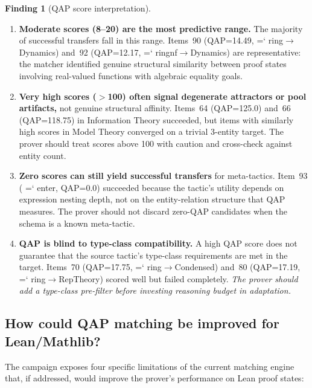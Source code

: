 \documentclass[11pt]{article}
\renewcommand{\texttt}[1]{%
  \begingroup\ttfamily\hyphenchar\font=`\-\relax
  \def\_{\textunderscore\discretionary{}{}{}}%
  #1\endgroup}
\theoremstyle{definition}
\newtheorem{finding}[theorem]{Finding}
\theoremstyle{remark}
\begin{document}
\begin{finding}[QAP score interpretation]%
\label{find:qap}
\begin{enumerate}
\item \textbf{Moderate scores (8--20) are the most predictive
  range.}  The majority of successful transfers fall in this range.
  Items~90 (QAP=14.49, \texttt{ring}$\to$Dynamics) and~92
  (QAP=12.17, \texttt{ring\_nf}$\to$Dynamics) are representative:
  the matcher identified genuine structural similarity between proof
  states involving real-valued functions with algebraic equality
  goals.

\item \textbf{Very high scores ($>$100) often signal degenerate
  attractors or pool artifacts,} not genuine structural affinity.
  Items~64 (QAP=125.0) and~66 (QAP=118.75) in Information Theory
  succeeded, but items with similarly high scores in Model Theory
  converged on a trivial 3-entity target.  The prover should treat
  scores above 100 with caution and cross-check against entity
  count.

\item \textbf{Zero scores can still yield successful transfers}
  for meta-tactics.  Item~93 (\texttt{enter}, QAP=0.0) succeeded
  because the tactic's utility depends on expression nesting depth,
  not on the entity-relation structure that QAP measures.  The
  prover should not discard zero-QAP candidates when the schema
  is a known meta-tactic.

\item \textbf{QAP is blind to type-class compatibility.}  A high
  QAP score does not guarantee that the source tactic's type-class
  requirements are met in the target.  Items~70 (QAP=17.75,
  \texttt{ring}$\to$Condensed) and~80 (QAP=17.19,
  \texttt{ring}$\to$RepTheory) scored well but failed completely.
  \emph{The prover should add a type-class pre-filter before
  investing reasoning budget in adaptation.}
\end{enumerate}
\end{finding}

\subsection{How could QAP matching be improved for Lean/Mathlib?}

The campaign exposes four specific limitations of the current
matching engine that, if addressed, would improve the prover's
performance on Lean proof states:
\end{document}

